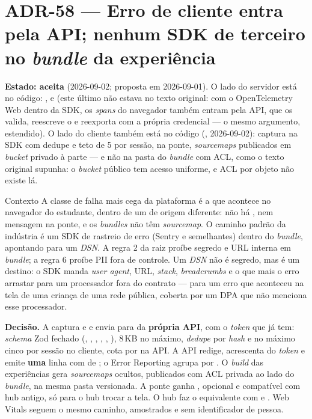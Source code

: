 \section{ADR-58 --- Erro de cliente entra pela API; nenhum SDK de terceiro
no \emph{bundle} da experiência}
\label{adr:erro-cliente-pela-api}

\textbf{Estado: aceita} (2026-09-02; proposta em 2026-09-01). O lado do
servidor está no código: ,
 e  (este último não estava no texto original:
com o OpenTelemetry Web dentro da SDK, os \emph{spans} do navegador também
entram pela API, que os valida, reescreve o  e reexporta com a
própria credencial --- o mesmo argumento, estendido). O lado do cliente
também está no código (, 2026-09-02): captura na SDK com
dedupe e teto de 5 por sessão,  na ponte, \emph{sourcemaps}
 publicados em \emph{bucket} privado à parte --- e não na pasta
do \emph{bundle} com ACL, como o texto original supunha: o \emph{bucket}
público tem acesso uniforme, e ACL por objeto não existe lá.

\begin{especificacao}{Contexto}
A classe de falha mais cega da plataforma é a que acontece no navegador do
estudante, dentro de um  de origem diferente: não há
,  nem mensagem  na
ponte, e os \emph{bundles} não têm \emph{sourcemap}. O caminho padrão da
indústria é um SDK de rastreio de erro (Sentry e semelhantes) dentro do
\emph{bundle}, apontando para um \emph{DSN}. A regra 2 da raiz proíbe segredo
e URL interna em \emph{bundle}; a regra 6 proíbe PII fora de controle. Um
\emph{DSN} não é segredo, mas é um destino: o SDK manda \emph{user agent},
URL, \emph{stack}, \emph{breadcrumbs} e o que mais o erro arrastar para um
processador fora do contrato --- para um erro que aconteceu na tela de uma
criança de uma rede pública, coberta por um DPA que não menciona esse
processador.
\end{especificacao}

\textbf{Decisão.} A  captura  e
 e envia para  da \textbf{própria API}, com o \emph{token}
que já tem: \emph{schema} Zod fechado (, ,
, , , ), 8\,KB no máximo,
\emph{dedupe} por \emph{hash} e no máximo cinco por sessão no cliente, cota
por  na API. A API redige, acrescenta 
do \emph{token} e emite \textbf{uma} linha  com
 de ; o Error Reporting agrupa por
. O \emph{build} das experiências gera \emph{sourcemaps}
ocultos, publicados com ACL privada ao lado do \emph{bundle}, na mesma pasta
versionada. A ponte ganha , opcional e compatível com hub
antigo, só para o hub trocar a tela. O hub faz o equivalente com
 e . Web Vitals seguem o mesmo caminho,
amostrados e sem identificador de pessoa.

